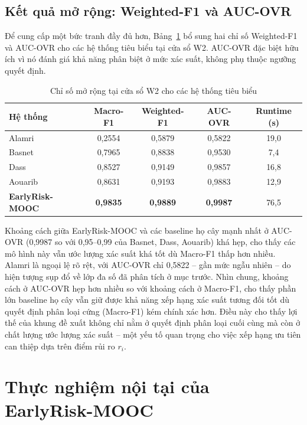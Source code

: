 \subsection{Kết quả mở rộng: Weighted-F1 và AUC-OVR}

Để cung cấp một bức tranh đầy đủ hơn, Bảng~\ref{tab:morong} bổ sung hai chỉ số Weighted-F1 và AUC-OVR cho các hệ thống tiêu biểu tại cửa sổ W2. AUC-OVR đặc biệt hữu ích vì nó đánh giá khả năng phân biệt ở mức xác suất, không phụ thuộc ngưỡng quyết định.

\begin{table}[H]
\centering
\caption{Chỉ số mở rộng tại cửa sổ W2 cho các hệ thống tiêu biểu}
\label{tab:morong}
\renewcommand{\arraystretch}{1.25}
\footnotesize
\begin{tabular}{@{}l cccc@{}}
\toprule
\textbf{Hệ thống} & \textbf{Macro-F1} & \textbf{Weighted-F1} & \textbf{AUC-OVR} & \textbf{Runtime (s)} \\
\midrule
Alamri \cite{Alamri2019}    & 0,2554 & 0,5879 & 0,5822 & 19,0 \\
Basnet \cite{Basnet2022}    & 0,7965 & 0,8838 & 0,9530 & 7,4 \\
Dass \cite{Dass2021}        & 0,8527 & 0,9149 & 0,9857 & 16,8 \\
Aouarib \cite{Aouarib2025}  & 0,8631 & 0,9193 & 0,9883 & 12,9 \\
\textbf{EarlyRisk-MOOC}     & \textbf{0,9835} & \textbf{0,9889} & \textbf{0,9987} & 76,5 \\
\bottomrule
\end{tabular}
\end{table}

Khoảng cách giữa EarlyRisk-MOOC và các baseline họ cây mạnh nhất ở AUC-OVR (0,9987 so với 0,95--0,99 của Basnet, Dass, Aouarib) khá hẹp, cho thấy các mô hình này vẫn ước lượng xác suất khá tốt dù Macro-F1 thấp hơn nhiều. Alamri là ngoại lệ rõ rệt, với AUC-OVR chỉ 0,5822 -- gần mức ngẫu nhiên -- do hiện tượng sụp đổ về lớp đa số đã phân tích ở mục trước. Nhìn chung, khoảng cách ở AUC-OVR hẹp hơn nhiều so với khoảng cách ở Macro-F1, cho thấy phần lớn baseline họ cây vẫn giữ được khả năng xếp hạng xác suất tương đối tốt dù quyết định phân loại cứng (Macro-F1) kém chính xác hơn. Điều này cho thấy lợi thế của khung đề xuất không chỉ nằm ở quyết định phân loại cuối cùng mà còn ở chất lượng ước lượng xác suất -- một yếu tố quan trọng cho việc xếp hạng ưu tiên can thiệp dựa trên điểm rủi ro $r_i$.

\section{Thực nghiệm nội tại của EarlyRisk-MOOC}
\label{sec:noitai}

